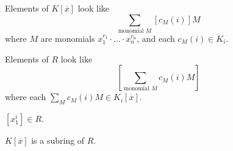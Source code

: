 \begin{note}
	Elements of \(K[\overline{x} ]\) look like
	\[
		\sum_{\text{monomial } M} [c_M(i)] M
	\]
	where \(M\) are monomials \(x_1^{r_1} \cdot \dots \cdot x_n^{r_n}\), and each \(c_M(i)\in K_i\).
\end{note}

\begin{note}
	Elements of \(R\) look like
	\[
		\left[ \sum_{\text{monomial } M} c_M(i)M \right]
	\]
	where each \(\sum_{M} c_M(i)M\in K_i[\overline{x} ]\).
\end{note}

\begin{eg}
	\([x_1^i]\in R\).
\end{eg}

\begin{claim}
	\(K[\overline{x} ]\) is a subring of \(R\).
\end{claim}
